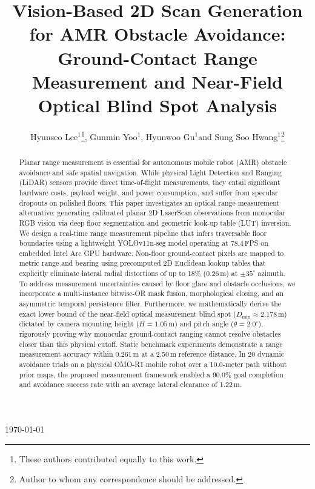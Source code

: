 \documentclass[12pt]{iopart}
\begin{document}
\title[Vision-Based 2D Scan Generation for AMR Obstacle Avoidance]{Vision-Based 2D Scan Generation for AMR Obstacle Avoidance: Ground-Contact Range Measurement and Near-Field Optical Blind Spot Analysis}

\author{Hyunseo Lee$^1$\footnote{These authors contributed equally to this work.}, Gunmin Yoo$^1$\footnotemark[1], Hyunwoo Gu$^1$\footnotemark[1] and Sung Soo Hwang$^1$\footnote{Author to whom any correspondence should be addressed.}}

\address{$^1$ School of Artificial Intelligence, Computer and Electrical Engineering, Handong Global University, 558 Handong-ro, Buk-gu, Pohang, Gyeongbuk 37554, Republic of Korea}

\vspace{10pt}
\begin{indented}
\item[]\today
\end{indented}

\begin{abstract}
Planar range measurement is essential for autonomous mobile robot (AMR) obstacle avoidance and safe spatial navigation. While physical Light Detection and Ranging (LiDAR) sensors provide direct time-of-flight measurements, they entail significant hardware costs, payload weight, and power consumption, and suffer from specular dropouts on polished floors. This paper investigates an optical range measurement alternative: generating calibrated planar 2D LaserScan observations from monocular RGB vision via deep floor segmentation and geometric look-up table (LUT) inversion. We design a real-time range measurement pipeline that infers traversable floor boundaries using a lightweight YOLOv11n-seg model operating at 78.4\,FPS on embedded Intel Arc GPU hardware. Non-floor ground-contact pixels are mapped to metric range and bearing using precomputed 2D Euclidean lookup tables that explicitly eliminate lateral radial distortions of up to 18\% (0.26\,m) at $\pm35^\circ$ azimuth. To address measurement uncertainties caused by floor glare and obstacle occlusions, we incorporate a multi-instance bitwise-OR mask fusion, morphological closing, and an asymmetric temporal persistence filter. Furthermore, we mathematically derive the exact lower bound of the near-field optical measurement blind spot ($D_{\min} \approx 2.178$\,m) dictated by camera mounting height ($H=1.05$\,m) and pitch angle ($\theta=2.0^\circ$), rigorously proving why monocular ground-contact ranging cannot resolve obstacles closer than this physical cutoff. Static benchmark experiments demonstrate a range measurement accuracy within 0.261\,m at a 2.50\,m reference distance. In 20 dynamic avoidance trials on a physical OMO-R1 mobile robot over a 10.0-meter path without prior maps, the proposed measurement framework enabled a 90.0\% goal completion and avoidance success rate with an average lateral clearance of 1.22\,m.
\end{abstract}
\end{document}

